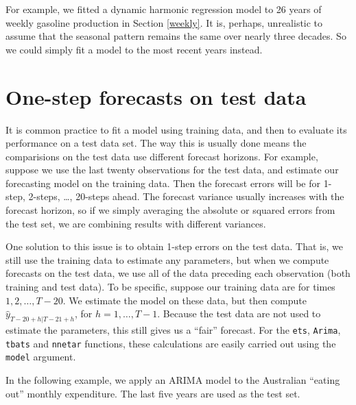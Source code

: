 \documentclass[]{book}
\begin{document}
For example, we fitted a dynamic harmonic regression model to 26 years of weekly gasoline production in Section \ref{weekly}. It is, perhaps, unrealistic to assume that the seasonal pattern remains the same over nearly three decades. So we could simply fit a model to the most recent years instead.

\hypertarget{oosos}{%
\section{One-step forecasts on test data}\label{oosos}}

It is common practice to fit a model using training data, and then to evaluate its performance on a test data set. The way this is usually done means the comparisions on the test data use different forecast horizons. For example, suppose we use the last twenty observations for the test data, and estimate our forecasting model on the training data. Then the forecast errors will be for 1-step, 2-steps, \ldots{}, 20-steps ahead. The forecast variance usually increases with the forecast horizon, so if we simply averaging the absolute or squared errors from the test set, we are combining results with different variances.

One solution to this issue is to obtain 1-step errors on the test data. That is, we still use the training data to estimate any parameters, but when we compute forecasts on the test data, we use all of the data preceding each observation (both training and test data). To be specific, suppose our training data are for times \(1,2,\dots,T-20\). We estimate the model on these data, but then compute \(\hat{y}_{T-20+h|T-21+h}\), for \(h=1,\dots,T-1\).
Because the test data are not used to estimate the parameters, this still gives us a ``fair'' forecast. For the \texttt{ets}, \texttt{Arima}, \texttt{tbats} and \texttt{nnetar} functions, these calculations are easily carried out using the \texttt{model} argument.

In the following example, we apply an ARIMA model to the Australian ``eating out'' monthly expenditure. The last five years are used as the test set.
\end{document}
